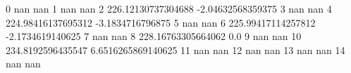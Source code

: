 0 nan nan
1 nan nan
2 226.12130737304688 -2.04632568359375
3 nan nan
4 224.98416137695312 -3.1834716796875
5 nan nan
6 225.99417114257812 -2.1734619140625
7 nan nan
8 228.16763305664062 0.0
9 nan nan
10 234.8192596435547 6.6516265869140625
11 nan nan
12 nan nan
13 nan nan
14 nan nan
